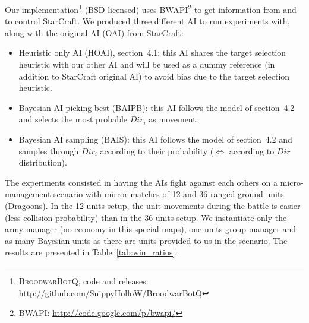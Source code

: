 Our implementation\footnote{\textsc{BroodwarBotQ}, code and releases: \url{http://github.com/SnippyHolloW/BroodwarBotQ}} (BSD licensed) uses BWAPI\footnote{BWAPI: \url{http://code.google.com/p/bwapi/}} to get information from and to control StarCraft. 
We produced three different AI to run experiments with, along with the original AI (OAI) from StarCraft:
\begin{itemize}
\item Heuristic only AI (HOAI), section~4.1: this AI shares the target selection heuristic with our other AI and will be used as a dummy reference (in addition to StarCraft original AI) to avoid bias due to the target selection heuristic.
\item Bayesian AI picking best (BAIPB): this AI follows the model of section~4.2 and selects the most probable $Dir_i$ as movement. 
\item Bayesian AI sampling (BAIS): this AI follows the model of section~4.2 and samples through $Dir_i$ according to their probability ($\Leftrightarrow$ according to $Dir$ distribution).
\end{itemize}

The experiments consisted in having the AIs fight against each others on a micro-management scenario with mirror matches of 12 and 36 ranged ground units (Dragoons). In the 12 units setup, the unit movements during the battle is easier (less collision probability) than in the 36 units setup. We instantiate only the army manager (no economy in this special maps), one units group manager and as many Bayesian units as there are units provided to us in the scenario. The results are presented in Table~\ref{tab:win_ratios}.

